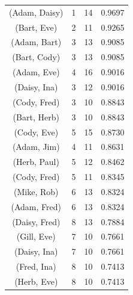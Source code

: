 \begin{table}[t]
{\begin{tabular}{@{\hspace{.2cm}}ccc@{\hspace{.75cm}}c@{\hspace{.2cm}}}
(Adam, Daisy)	&	1&	14&	0.9697	\\ %
(Bart, Eve)	&	2&	11&	0.9265	\\ %
(Adam, Bart)	&	3&	13&	0.9085	\\ %
(Bart, Cody)	&	3&	13&	0.9085	\\ %
(Adam, Eve)	&	4&	16&	0.9016	\\ %
(Daisy, Ina)	&	3&	12&	0.9016	\\ %
(Cody, Fred)	&	3&	10&	0.8843	\\ %
(Bart, Herb)	&	3&	10&	0.8843	\\ %
(Cody, Eve)	&	5&	15&	0.8730	\\ %
(Adam, Jim)	&	4&	11&	0.8631	\\ %
(Herb, Paul)	&	5&	12&	0.8462	\\ %
(Cody, Fred)	&	5&	11&	0.8345	\\ %
(Mike, Rob)	&	6&	13&	0.8324	\\ %
(Adam, Fred)	&	6&	13&	0.8324	\\ %
(Daisy, Fred)	&	8&	13&	0.7884	\\ %
(Gill, Eve)		&	7&	10&	0.7661	\\ %
(Daisy, Ina)	&	7&	10&	0.7661	\\ %
(Fred, Ina)	&	8&	10&	0.7413	\\ %
(Herb, Eve)	&	8&	10&	0.7413	\\ %
\bottomrule
\end{tabular}
\label{tab:badtechpairs}
}\hspace{1.3cm}
%
\end{table}
